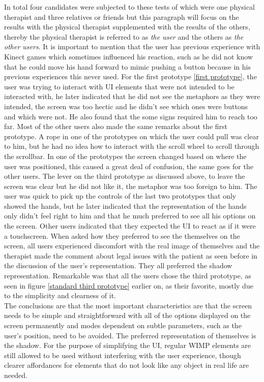 In total four candidates were subjected to these tests of which were one physical therapist and three relatives or friends but this paragraph will focus on the results with the physical therapist supplemented with the results of the others, thereby the physical therapist is referred to as \emph{the user} and the others as \emph{the other users}. It is important to mention that the user has previous experience with Kinect games which sometimes influenced his reaction, such as he did not know that he could move his hand forward to mimic pushing a button because in his previous experiences this never used. For the first prototype  \ref{first prototype}, the user was trying to interact with UI elements that were not intended to be interacted with, he later indicated that he did not see the metaphors as they were intended, the screen was too hectic and he didn't see which ones were buttons and which were not. He also found that the some signs required him to reach too far. Most of the other users also made the same remarks about the first prototype. A rope in one of the prototypes on which the user could pull was clear to him, but he had no idea how to interact with the scroll wheel to scroll through the scrollbar. In one of the prototypes the screen changed based on where the user was positioned, this caused a great deal of confusion, the same goes for the other users. The lever on the third prototype as discussed above, to leave the screen was clear but he did not like it, the metaphor was too foreign to him. The user was quick to pick up the controls of the last two prototypes that only showed the hands, but he later indicated that the representation of the hands only didn't feel right to him and that he much preferred to see all his options on the screen. Other users indicated that they expected the UI to react as if it were a touchscreen. When asked how they preferred to see the themselves on the screen, all users experienced discomfort with the real image of themselves and the therapist made the comment about legal issues with the patient as seen before in the discussion of the user's representation. They all preferred the shadow representation.  Remarkable was that all the users chose the third prototype, as seen in figure \ref{standard third prototype} earlier on, as their favorite, mostly due to the simplicity and clearness of it.\\

The conclusions are that the most important characteristics are that the screen needs to be simple and straightforward with all of the options displayed on the screen permanently and modes dependent on subtle parameters, such as the user's position, need to be avoided. The preferred representation of themselves is the shadow. For the purpose of simplifying the UI, regular WIMP elements are still allowed to be used without interfering with the user experience, though clearer affordances for elements that do not look like any object in real life are needed.\\

